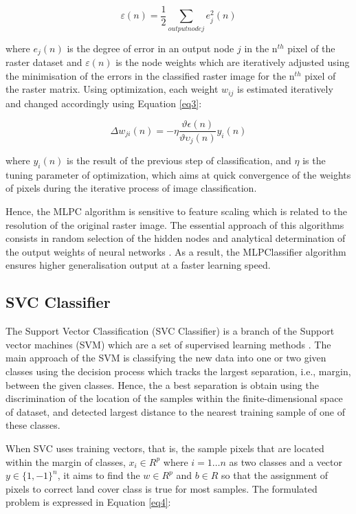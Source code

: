 \documentclass[final,5p,times,twocolumn]{elsarticle}
\begin{document}
\begin{equation}
\varepsilon(n)=\frac{1}{2} \sum_{output node j}{e_{j}^2(n)}
\label{eq2}
\end{equation}

where $e_j(n)$ is the degree of error in an output node $j$ in the n$^{th}$  pixel of the raster dataset and $\varepsilon(n)$ is the node weights which are iteratively adjusted using the minimisation of the errors in the classified raster image for the n$^{th}$ pixel of the raster matrix. Using optimization, each weight $w_{ij}$ is estimated iteratively and changed accordingly using Equation \ref{eq3}: 

\begin{equation}
\Delta w_{ji}(n)=-\eta\frac{\vartheta\epsilon(n)}{\vartheta\upsilon_{j}(n)}y_{i}(n)
\label{eq3}
\end{equation}

where $y_{i}(n)$ is the result of the previous step of classification, and $\eta$ is the tuning parameter of optimization, which aims at quick convergence of the weights of pixels during the iterative process of image classification.

Hence, the MLPC algorithm is sensitive to feature scaling which is related to the resolution of the original raster image. The essential approach of this algorithms consists in random selection of the hidden nodes and analytical determination of the output weights of neural networks \cite{HUANG2006489}. As a result, the MLPClassifier algorithm ensures higher generalisation output at a faster learning speed. 

\subsection{SVC Classifier}

The Support Vector Classification (SVC Classifier) is a branch of the Support vector machines (SVM) which are a set of supervised learning methods \cite{Cortes}. The main approach of the SVM is classifying the new data into one or two given classes using the decision process which tracks the largest separation, i.e., margin, between the given classes. Hence, the a best separation is obtain using the discrimination of the location of the samples within the finite-dimensional space of dataset, and detected largest distance to the nearest training sample of one of these classes. 

When SVC uses training vectors, that is, the sample pixels that are located within the margin of classes,
$x_{i} \in R^p$ where $ i=1 \dots n$ as two classes and a vector $y \in \{1, - 1\}^n$, it aims to find the $w \in R^p$ and $b \in R$ so that the assignment of pixels to correct land cover class is true for most samples. The formulated problem is expressed in Equation \ref{eq4}:
\end{document}
